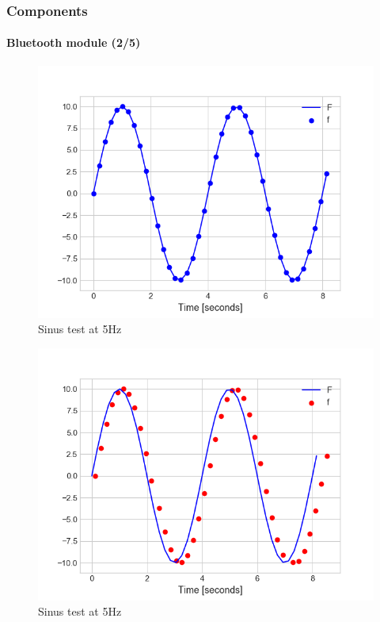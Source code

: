 \documentclass[10pt]{beamer}
\begin{document}
\begin{frame}
\frametitle{Components}
\framesubtitle{Bluetooth module (2/5)}
\begin{multicols}{2}
\begin{figure}
\centering
\includegraphics[scale=0.4]{figures/sending-5hz.png}
\caption{Sinus test at 5Hz}
\end{figure}
\columnbreak
\begin{figure}
\centering
\includegraphics[scale=0.4]{figures/reception-5hz.png}
\caption{Sinus test at 5Hz}
\end{figure}
\end{multicols}
\end{frame}
\end{document}
